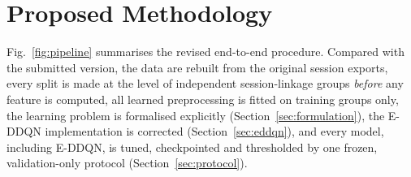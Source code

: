 \section{Proposed Methodology}
\label{sec:method}

Fig.~\ref{fig:pipeline} summarises the revised end-to-end procedure. Compared with the submitted version, the data are rebuilt from the original session exports, every split is made at the level of independent session-linkage groups \emph{before} any feature is computed, all learned preprocessing is fitted on training groups only, the learning problem is formalised explicitly (Section~\ref{sec:formulation}), the E-DDQN implementation is corrected (Section~\ref{sec:eddqn}), and every model, including E-DDQN, is tuned, checkpointed and thresholded by one frozen, validation-only protocol (Section~\ref{sec:protocol}).

